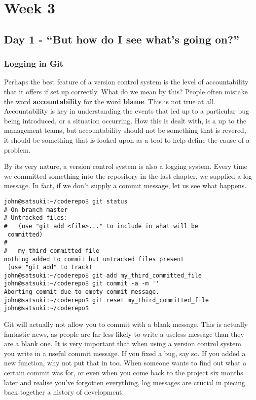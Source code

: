 \cleardoublepage

\chapter{Week 3}
\section{Day 1 - ``But how do I see what's going on?''}
\subsection{Logging in Git}

Perhaps the best feature of a version control system is the level of accountability that it offers if set up correctly.  What do we mean by this?  People often mistake the word \textbf{accountability} for the word \textbf{blame}.  This is not true at all.  Accountability is key in understanding the events that led up to a particular bug being introduced, or a situation occurring.  How this is dealt with, is a up to the management teams, but accountability should not be something that is revered, it should be something that is looked upon as a tool to help define the cause of a problem.

By its very nature, a version control system is also a logging system.  Every time we committed something into the repository in the last chapter, we supplied a log message.  In fact, if we don't supply a commit message, let us see what happens.

\begin{Verbatim}[frame=leftline,framerule=1mm,fontsize=\relsize{-3}] 
john@satsuki:~/coderepo$ git status
# On branch master
# Untracked files:
#   (use "git add <file>..." to include in what will be 
 committed)
#
#	my_third_committed_file
nothing added to commit but untracked files present 
 (use "git add" to track)
john@satsuki:~/coderepo$ git add my_third_committed_file
john@satsuki:~/coderepo$ git commit -a -m ''
Aborting commit due to empty commit message.
john@satsuki:~/coderepo$ git reset my_third_committed_file
john@satsuki:~/coderepo$ 
\end{Verbatim}

Git will actually not allow you to commit with a blank message.  This is actually fantastic news, as people are far less likely to write a useless message than they are a blank one.  It is very important that when using a version control system you write in a useful commit message.  If you fixed a bug, say so.  If you added a new function, why not put that in too.  When someone wants to find out what a certain commit was for, or even when you come back to the project six months later and realise you've forgotten everything, log messages are crucial in piecing back together a history of development.

